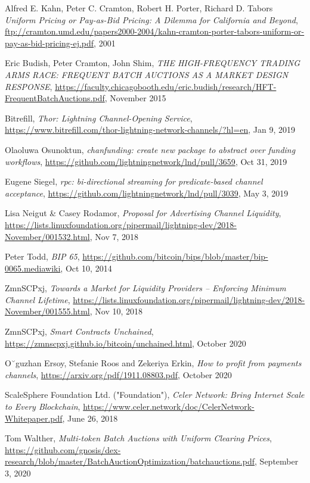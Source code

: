 \documentclass[10pt,a4paper]{article}
\theoremstyle{definition}
\begin{document}
\begin{thebibliography}{9}
    Alfred E. Kahn, Peter C. Cramton, Robert H. Porter, Richard D. Tabors
    \textit{Uniform Pricing or Pay-as-Bid Pricing: A Dilemma for California and Beyond},
    \url{ftp://cramton.umd.edu/papers2000-2004/kahn-cramton-porter-tabors-uniform-or-pay-as-bid-pricing-ej.pdf},
    2001

    Eric Budish, Peter Cramton, John Shim,
    \textit{THE HIGH-FREQUENCY TRADING ARMS RACE: FREQUENT BATCH AUCTIONS AS A MARKET DESIGN RESPONSE},
    \url{https://faculty.chicagobooth.edu/eric.budish/research/HFT-FrequentBatchAuctions.pdf},
    November 2015

    Bitrefill,
    \textit{Thor: Lightning Channel-Opening Service},
    \url{https://www.bitrefill.com/thor-lightning-network-channels/?hl=en},
    Jan 9, 2019

    Olaoluwa Osunoktun,
    \textit{chanfunding: create new package to abstract over funding workflows},
    \url{https://github.com/lightningnetwork/lnd/pull/3659},
    Oct 31, 2019

    Eugene Siegel,
    \textit{rpc: bi-directional streaming for predicate-based channel acceptance},
    \url{https://github.com/lightningnetwork/lnd/pull/3039},
    May 3, 2019

    Lisa Neigut \& Casey Rodamor,
    \textit{Proposal for Advertising Channel Liquidity},
    \url{https://lists.linuxfoundation.org/pipermail/lightning-dev/2018-November/001532.html},
    Nov 7, 2018

    Peter Todd,
    \textit{BIP 65},
    \url{https://github.com/bitcoin/bips/blob/master/bip-0065.mediawiki},
    Oct 10, 2014

    ZmnSCPxj,
    \textit{Towards a Market for Liquidity Providers -- Enforcing Minimum Channel Lifetime},
    \url{https://lists.linuxfoundation.org/pipermail/lightning-dev/2018-November/001555.html},
    Nov 10, 2018

    ZmnSCPxj,
    \textit{Smart Contracts Unchained},
    \url{https://zmnscpxj.github.io/bitcoin/unchained.html},
    October 2020

    O˘guzhan Ersoy, Stefanie Roos and Zekeriya Erkin,
    \textit{How to profit from payments channels},
    \url{https://arxiv.org/pdf/1911.08803.pdf},
    October 2020

    ScaleSphere Foundation Ltd. ("Foundation"),
    \textit{Celer Network: Bring Internet Scale to Every Blockchain},
    \url{https://www.celer.network/doc/CelerNetwork-Whitepaper.pdf},
    June 26, 2018

    Tom Walther,
    \textit{Multi-token Batch Auctions with Uniform Clearing Prices},
    \url{https://github.com/gnosis/dex-research/blob/master/BatchAuctionOptimization/batchauctions.pdf},
    September 3, 2020


\end{thebibliography}
\end{document}
